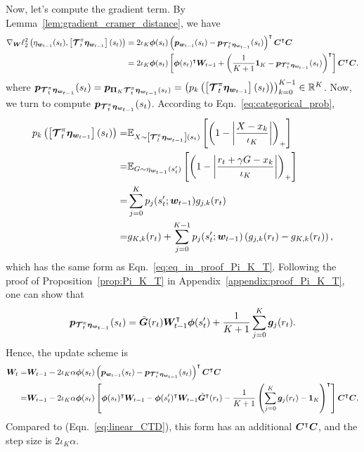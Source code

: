 Now, let's compute the gradient term.
By Lemma~\ref{lem:gradient_cramer_distance}, we have
    \begin{align*}
        \nabla_{{\bm{W}}} \ell_2^2\left({{\eta}_{{\bm{w}}_{t-1}}(s_t),\left[{\bm{\mathcal{T}}_t^\pi{\bm{\eta}_{{\bm{w}}_{t-1}}}}\right](s_{t})}\right)&=2\iota_K{\bm{\phi}}(s_t)\left({{\bm{p}}_{{\bm{w}}_{t-1}}(s_t)-{\bm{p}}_{\bm{\mathcal{T}}_t^\pi{\bm{\eta}_{{\bm{w}}_{t-1}}}}(s_t)}\right)^{\intercal}{\bm{C}}^{\intercal}{\bm{C}}\\
        &=2\iota_K{\bm{\phi}}(s_t)\left[{{\bm{\phi}}(s_t)^{\intercal}{\bm{W}}_{t-1}+\left({\frac{1}{K+1}\bm{1}_{K}-{\bm{p}}_{\bm{\mathcal{T}}_t^\pi{\bm{\eta}_{{\bm{w}}_{t-1}}}}(s_t)}\right)^{\intercal}}\right]{\bm{C}}^{\intercal}{\bm{C}}.
    \end{align*}
where ${\bm{p}}_{\bm{\mathcal{T}}_t^\pi{\bm{\eta}_{{\bm{w}}_{t-1}}}}(s_t)={\bm{p}}_{{\bm{\Pi}}_K\bm{\mathcal{T}}_t^\pi{\bm{\eta}_{{\bm{w}}_{t-1}}}(s_t)}=\left({p_k\left({\left[{\bm{\mathcal{T}}_t^\pi{\bm{\eta}_{{\bm{w}}_{t-1}}}}\right](s_t)}\right)}\right)_{k=0}^{K-1}\in{\mathbb R}^{K}$.
Now, we turn to compute ${\bm{p}}_{\bm{\mathcal{T}}_t^\pi{\bm{\eta}_{{\bm{w}}_{t-1}}}}(s_t)$.
According to Eqn.~\eqref{eq:categorical_prob},
    \begin{align*}
        p_k\left({\left[{\bm{\mathcal{T}}_t^\pi{\bm{\eta}_{{\bm{w}}_{t-1}}}}\right](s_t)}\right)=&{\mathbb E}_{X\sim \left[{\bm{\mathcal{T}}_t^\pi{\bm{\eta}_{{\bm{w}}_{t-1}}}}\right](s_t)}\left[{\left({1-\left|{\frac{X-x_k}{\iota_K}}\right|}\right)_+}\right]\\
        =&{\mathbb E}_{G\sim \eta_{{\bm{w}}_{t-1}}(s_t^\prime)}\left[{\left({1-\left|{\frac{r_t+\gamma G-x_k}{\iota_K}}\right|}\right)_+}\right]\\
=&\sum_{j=0}^Kp_j(s_t^\prime;
{\bm{w}}_{t-1})g_{j,k}(r_t)\\
=&g_{K,k}(r_t)+\sum_{j=0}^{K-1}p_j(s_t^\prime;
{\bm{w}}_{t-1})\left({g_{j,k}(r_t)-g_{K,k}(r_t)}\right),
    \end{align*}
which has the same form as Eqn.~\eqref{eq:eq_in_proof_Pi_K_T}.
Following the proof of Proposition~\ref{prop:Pi_K_T} in Appendix~\ref{appendix:proof_Pi_K_T}, one can show that
\begin{equation}\label{eq:project_bellman_w}
    \begin{aligned}
             {\bm{p}}_{\bm{\mathcal{T}}_t^\pi{\bm{\eta}_{{\bm{w}}_{t-1}}}}(s_t)=\tilde{{\bm{G}}}(r_t) {\bm{W}}^{\intercal}_{t-1} {\bm{\phi}}(s_t^\prime)+\frac{1}{K+1}\sum_{j=0}^K{\bm{g}}_j(r_t).
    \end{aligned}
\end{equation}
Hence, the update scheme is
\begin{equation}\label{eq:ssgd_pmf}
    \begin{aligned}
{\bm{W}}_t=&{\bm{W}}_{t-1}-2\iota_K\alpha{\bm{\phi}}(s_t)\left({{\bm{p}}_{{\bm{w}}_{t-1}}(s_t)-{\bm{p}}_{\bm{\mathcal{T}}_t^\pi{\bm{\eta}_{{\bm{w}}_{t-1}}}}(s_t)}\right)^{\intercal}{\bm{C}}^{\intercal}{\bm{C}}\\
=&{\bm{W}}_{t-1}-2\iota_K\alpha{\bm{\phi}}(s_t)\left[{{\bm{\phi}}(s_t)^{\intercal}{\bm{W}}_{t-1}-{\bm{\phi}}(s_t^\prime)^{\intercal}{\bm{W}}_{t-1}\tilde{{\bm{G}}}^{\intercal}(r_t)-\frac{1}{K+1}\left({\sum_{j=0}^K{\bm{g}}_j(r_t)-\bm{1}_{K}}\right)^{\intercal}}\right]{\bm{C}}^{\intercal}{\bm{C}}.
\end{aligned}
\end{equation}
Compared to {\LCTD} (Eqn.~\eqref{eq:linear_CTD}), this form has an additional ${\bm{C}}^{\intercal}{\bm{C}}$, and the step size is $2\iota_K\alpha$.

